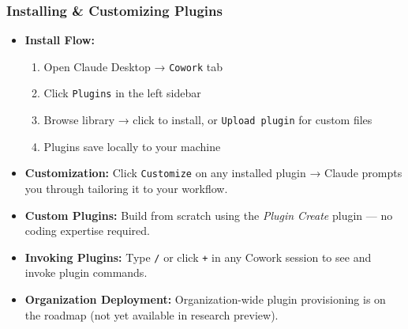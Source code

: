 \begin{frame}[fragile]\frametitle{Installing \& Customizing Plugins}
  \begin{itemize}
    \item \textbf{Install Flow:}
      \begin{enumerate}
        \item Open Claude Desktop → \texttt{Cowork} tab
        \item Click \texttt{Plugins} in the left sidebar
        \item Browse library → click to install, or \texttt{Upload plugin} for custom files
        \item Plugins save locally to your machine
      \end{enumerate}
    \item \textbf{Customization:} Click \texttt{Customize} on any installed plugin → Claude prompts you through tailoring it to your workflow.
    \item \textbf{Custom Plugins:} Build from scratch using the \textit{Plugin Create} plugin — no coding expertise required.
    \item \textbf{Invoking Plugins:} Type \texttt{/} or click \texttt{+} in any Cowork session to see and invoke plugin commands.
    \item \textbf{Organization Deployment:} Organization-wide plugin provisioning is on the roadmap (not yet available in research preview).
  \end{itemize}
\end{frame}

